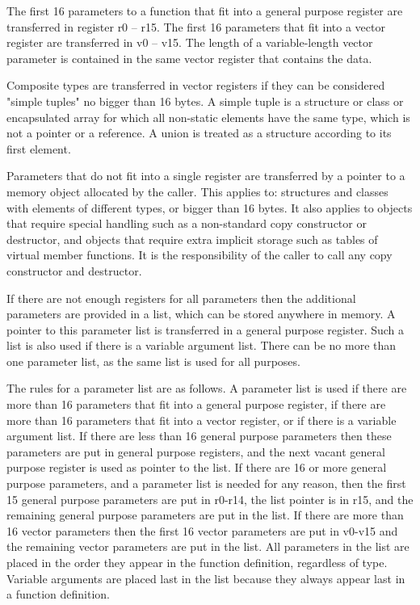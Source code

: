 \documentclass[forwardcom.tex]{subfiles}
\begin{document}
The first 16 parameters to a function that fit into a general purpose register are transferred in register r0 – r15. The first 16 parameters that fit into a vector register are transferred in v0 – v15. The length of a variable-length vector parameter is contained in the same vector register that contains the data. 
\vv

Composite types are transferred in vector registers if they can be considered "simple tuples" no bigger than 16 bytes. A simple tuple is a structure or class or encapsulated array for which all non-static elements have the same type, which is not a pointer or a reference. A union is treated as a structure according to its first element. 
\vv

Parameters that do not fit into a single register are transferred by a pointer to a memory object allocated by the caller. This applies to: structures and classes with elements of different types, or bigger than 16 bytes. It also applies to objects that require special handling such as a non-standard copy constructor or destructor, and objects that require extra implicit storage such as tables of virtual member functions. It is the responsibility of the caller to call any copy constructor and destructor.
\vv

If there are not enough registers for all parameters then the additional parameters are provided in a list, which can be stored anywhere in memory. A pointer to this parameter list is transferred in a general purpose register. Such a list is also used if there is a variable argument list. There can be no more than one parameter list, as the same list is used for all purposes. 
\vv

The rules for a parameter list are as follows. A parameter list is used if there are more than 16 parameters that fit into a general purpose register, if there are more than 16 parameters that fit into a vector register, or if there is a variable argument list. If there are less than 16 general purpose parameters then these parameters are put in general purpose registers, and the next vacant general purpose register is used as pointer to the list. If there are 16 or more general purpose parameters, and a parameter list is needed for any reason, then the first 15 general purpose parameters are put in r0-r14, the list pointer is in r15, and the remaining general purpose parameters are put in the list. If there are more than 16 vector parameters then the first 16 vector parameters are put in v0-v15 and the remaining vector parameters are put in the list. All parameters in the list are placed in the order they appear in the function definition, regardless of type. Variable arguments are placed last in the list because they always appear last in a function definition. 
\vv
\end{document}
